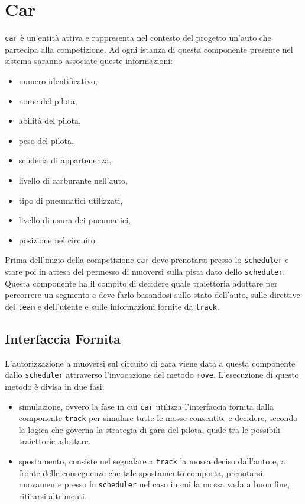 \documentclass[11pt,a4paper]{report}
\newcommand{\fun}[1]{\texttt{#1}}
\begin{document}
\section{Car}
\texttt{car} è un'entità attiva e rappresenta nel contesto del progetto un'auto che partecipa alla competizione. Ad ogni istanza di questa componente presente nel sistema saranno associate queste informazioni:
\begin{itemize}
\item numero identificativo,
\item nome del pilota,
\item abilità del pilota,
\item peso del pilota,
\item scuderia di appartenenza,
\item livello di carburante nell'auto,
\item tipo di pneumatici utilizzati,
\item livello di usura dei pneumatici,
\item posizione nel circuito.
\end{itemize}
Prima dell'inizio della competizione \texttt{car} deve prenotarsi presso lo \texttt{scheduler} e stare poi in attesa del permesso di muoversi sulla pista dato dello \texttt{scheduler}.
Questa componente ha il compito di decidere quale traiettoria adottare per percorrere un segmento e deve farlo basandosi sullo stato dell'auto, sulle direttive dei \texttt{team} e dell'utente e sulle informazioni fornite da \texttt{track}.

\subsection*{Interfaccia Fornita}
L'autorizzazione a muoversi sul circuito di gara viene data a questa componente dallo \texttt{scheduler} attraverso l'invocazione del metodo \fun{move}. L'esecuzione di questo metodo è divisa in due fasi:
\begin{itemize}
\item simulazione, ovvero la fase in cui \texttt{car} utilizza l'interfaccia fornita dalla componente \texttt{track} per simulare tutte le mosse consentite e decidere, secondo la logica che governa la strategia di gara del pilota, quale tra le possibili traiettorie adottare.
\item spostamento, consiste nel segnalare a \texttt{track} la mossa deciso dall'auto e, a fronte delle conseguenze che tale spostamento comporta, prenotarsi nuovamente presso lo \texttt{scheduler} nel caso in cui la mossa vada a buon fine, ritirarsi altrimenti.
\end{itemize}
\end{document}
